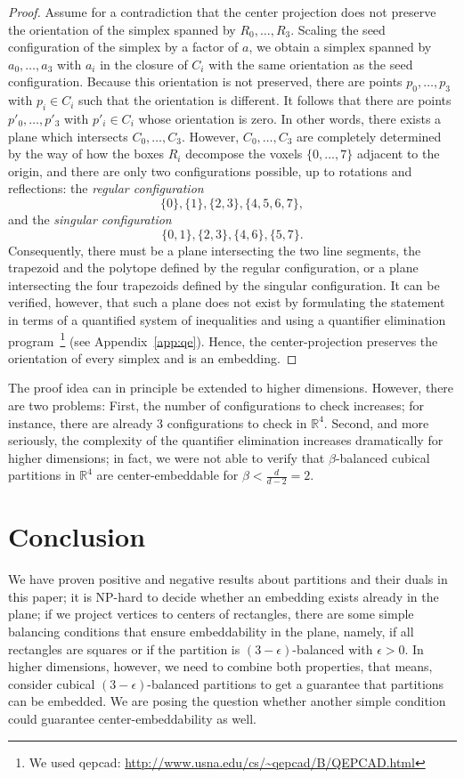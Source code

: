 \documentclass[12pt]{article}
\newcommand{\R}{\mathbb{R}}
\newcommand{\eps}{\epsilon}
\begin{document}
\begin{proof}
Assume for a contradiction that the center projection does not preserve
the orientation of the simplex spanned by $R_0,\ldots,R_3$.
Scaling the seed configuration of the simplex by a factor of $a$, 
we obtain a simplex spanned by $a_0,\ldots,a_3$ with $a_i$ in the closure
of $C_i$ with the same orientation as the seed configuration. Because
this orientation is not preserved, there are points $p_0,\ldots,p_3$
with $p_i\in C_i$ such that the orientation is different. It follows
that there are points $p'_0,\ldots,p'_3$ with
$p'_i\in C_i$ whose orientation is zero. In other words, there exists
a plane which intersects $C_0,\ldots,C_3$.
However, $C_0,\ldots,C_3$ are completely determined
by the way of how the boxes $R_i$ decompose the voxels $\{0,\ldots,7\}$
adjacent to the origin, and there are only two configurations possible,
up to rotations and reflections:
the \emph{regular configuration}
\[\{0\}, \{1\}, \{2,3\}, \{4,5,6,7\},\]
and the \emph{singular configuration}
\[\{0,1\}, \{2,3\} ,\{4,6\}, \{5,7\}.\]
Consequently, there must be a plane intersecting the two line segments, the
trapezoid and the polytope defined by the regular configuration,
or a plane intersecting the four trapezoids defined 
by the singular configuration. It can be verified, however, that such a plane
does not exist by formulating the statement in terms of a quantified
system of inequalities and using a quantifier elimination program~\cite{ch-partial}\footnote{We used
qepcad: \url{http://www.usna.edu/cs/~qepcad/B/QEPCAD.html}} (see Appendix~\ref{app:qe}). 
Hence, the center-projection
preserves the orientation of every simplex and is an embedding.
\end{proof}

The proof idea can in principle be extended to higher dimensions. However,
there are two problems: First, the number of configurations to check
increases; for instance, there are already 3 configurations to check in $\R^4$.
Second, and more seriously, the complexity of the quantifier elimination
increases dramatically for higher dimensions; in fact, we were not able
to verify that $\beta$-balanced cubical partitions in $\R^4$ 
are center-embeddable for $\beta<\frac{d}{d-2}=2$.

\section{Conclusion}
\label{sec:conclusion}

We have proven positive and negative results about partitions and their duals 
in this paper; it is NP-hard to
decide whether an embedding exists already in the plane; if we project
vertices to centers of rectangles, there are some simple balancing
conditions that ensure embeddability in the plane, namely, if
all rectangles are squares or if the partition is $(3-\eps)$-balanced
with $\eps>0$. In higher dimensions, however, we need to combine
both properties, that means, consider cubical $(3-\eps)$-balanced partitions
to get a guarantee that partitions can be embedded.
We are posing the question whether another simple condition could
guarantee center-embeddability as well.
\end{document}

